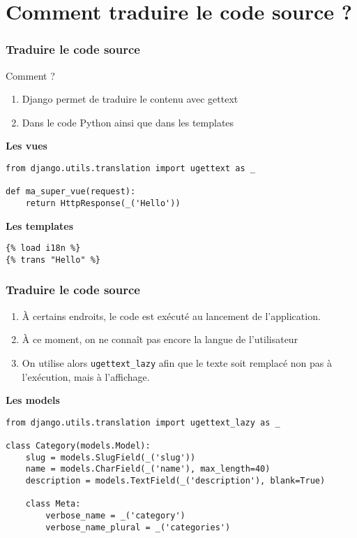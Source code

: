 \documentclass{beamer}
\begin{document}
\section{Comment traduire le code source ?}

\begin{frame}[fragile]
  \frametitle{Traduire le code source}
    \begin{alertblock}{Comment ?}
    \begin{enumerate}
      \pause \item Django permet de traduire le contenu avec gettext
      \pause \item Dans le code Python ainsi que dans les templates
    \end{enumerate}
    \end{alertblock}
    \pause
    \textbf{Les vues}
  \begin{lstlisting}
from django.utils.translation import ugettext as _

def ma_super_vue(request):
    return HttpResponse(_('Hello'))
  \end{lstlisting}
  \pause
  \textbf{Les templates}
  \begin{lstlisting}
{% load i18n %}
{% trans "Hello" %}
  \end{lstlisting}

\end{frame}


\begin{frame}[fragile]
  \frametitle{Traduire le code source}

\begin{enumerate}
  \item À certains endroits, le code est exécuté au lancement de l'application.
  \pause \item À ce moment, on ne connaît pas encore la langue de l'utilisateur
  \pause \item On utilise alors \texttt{ugettext\_lazy} afin que le texte soit remplacé non pas à l'exécution, mais à l'affichage.
\end{enumerate}
\pause
  \textbf{Les models}
  \begin{lstlisting}
from django.utils.translation import ugettext_lazy as _

class Category(models.Model):
    slug = models.SlugField(_('slug'))
    name = models.CharField(_('name'), max_length=40)
    description = models.TextField(_('description'), blank=True)

    class Meta:
        verbose_name = _('category')
        verbose_name_plural = _('categories')
  \end{lstlisting}

\end{frame}
\end{document}
